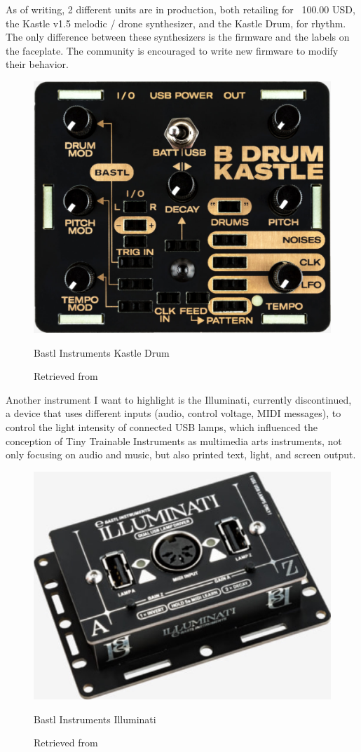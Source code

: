 As of writing, 2 different units are in production, both retailing for ~100.00 USD, the Kastle v1.5 melodic / drone synthesizer, and the Kastle Drum, for rhythm. The only difference between these synthesizers is the firmware and the labels on the faceplate. The community is encouraged to write new firmware to modify their behavior. 

\begin{figure}[ht]
  \centering
  \includegraphics[width=0.75\linewidth,height=0.25\textheight,keepaspectratio]{images/bastl-kastle-drum.jpg}
  \caption{Bastl Instruments Kastle Drum}
  \caption*{Retrieved from \cite{website-bastl-instruments-current}}
  \label{fig:bastl-kastle-drum}
\end{figure}

Another instrument I want to highlight is the Illuminati, currently discontinued, a device that uses different inputs (audio, control voltage, MIDI messages), to control the light intensity of connected USB lamps, which influenced the conception of Tiny Trainable Instruments as multimedia arts instruments, not only focusing on audio and music, but also printed text, light, and screen output.

\begin{figure}[ht]
  \centering
  \includegraphics[width=0.75\linewidth,height=0.25\textheight,keepaspectratio]{images/bastl-illuminati.jpg}
  \caption{Bastl Instruments Illuminati}
  \caption*{Retrieved from \cite{website-bastl-instruments-current}}
  \label{fig:bastl-illuminati}
\end{figure}

